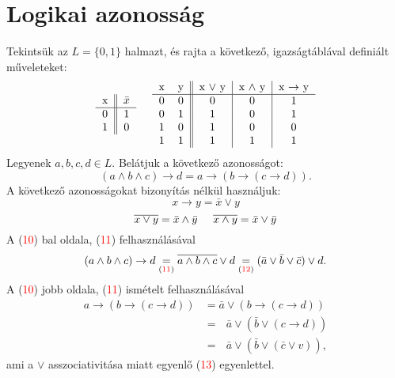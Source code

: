 \documentclass{article}
\begin{document}
\section{Logikai azonosság}
Tekintsük az $L = \{0,1\}$ halmazt, és rajta a következő, igazságtáblával definiált műveleteket:
\begin{equation}
\begin{tabular}{c||c}
x & $\bar{x}$ \\ \hline
0 & 1 \\
1 & 0 \\
\end{tabular} \hspace{0.5cm}
\begin{tabular}{cc||c|c|c}
x & y & x $\vee$ y & x $\wedge$ y & x $\rightarrow$ y \\ \hline
0 & 0 & 0 & 0 & 1 \\
0 & 1 & 1 & 0 & 1 \\
1 & 0 & 1 & 0 & 0 \\
1 & 1 & 1 & 1 & 1
\end{tabular}
\end{equation}
Legyenek $a,b,c,d \in L$. Belátjuk a következő azonosságot:
\begin{equation}
(a \wedge b \wedge c) \rightarrow d = a \rightarrow (b \rightarrow (c \rightarrow d)).
\end{equation}
A következő azonosságokat bizonyítás nélkül használjuk:
\begin{equation}
x \rightarrow y = \bar{x} \vee y
\end{equation}
\begin{equation}
\overline{x \vee y} = \bar{x} \wedge \bar{y} \hspace{0.5cm}
\overline{x \wedge y} = \bar{x} \vee \bar{y}
\end{equation}
A (\textcolor{red}{10}) bal oldala, (\textcolor{red}{11}) felhasználásával
\begin{equation}
(a \wedge b \wedge c) \rightarrow d \underset{(\textcolor{red}{11})}{=} \overline{a \wedge b \wedge c} \vee d \underset{(\textcolor{red}{12})}{=} (\bar{a} \vee \bar{b} \vee \bar{c}) \vee d.
\end{equation}
A (\textcolor{red}{10}) jobb oldala, (\textcolor{red}{11}) ismételt felhasználásával
\begin{equation}
\begin{aligned}
a \rightarrow (b \rightarrow (c \rightarrow d)) &= \bar{a} \vee (b \rightarrow  (c \rightarrow d))\\ 
&= \text{	} \bar{a} \vee (\bar{b} \vee (c \rightarrow d))\\
&= \text{	} \bar{a} \vee (\bar{b} \vee (\bar{c} \vee v)),
\end{aligned}
\end{equation}
ami a $\vee$ asszociativitása miatt egyenlő (\textcolor{red}{13}) egyenlettel.
\end{document}
